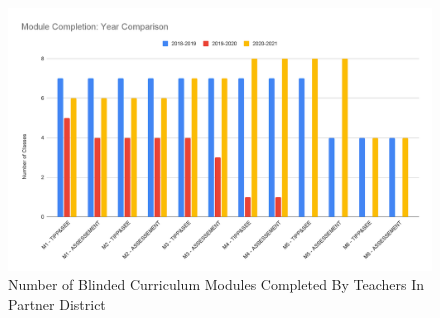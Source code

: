 \documentclass[sigconf,manuscript,review,anonymous]{acmart} %
\def\ts{TIPP\&SEE}
\newcommand{\Scratchencore}[0]{Blinded Curriculum}
\begin{document}
\begin{figure}
     \centering
     \includegraphics[width=\textwidth]{images/graphs/Modules Completed.png}
     \caption{Number of \Scratchencore{} Modules Completed By Teachers In Partner District}
     \label{fig:modules_completed}
    
\end{figure}
\end{document}
